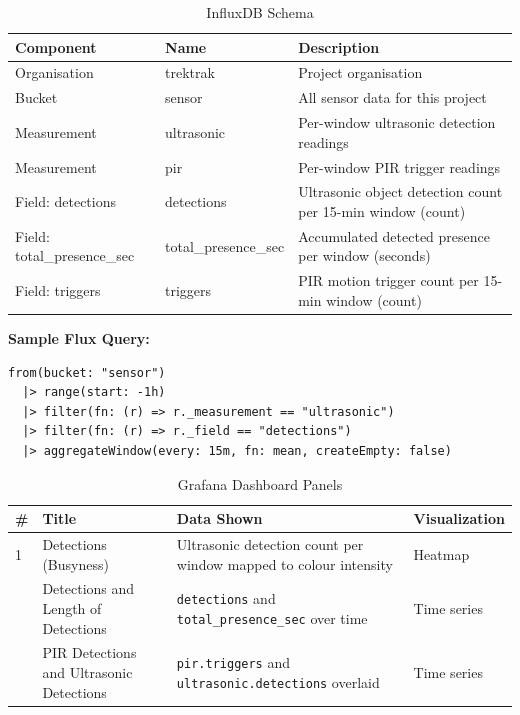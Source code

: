 \documentclass[11pt]{article}
\begin{document}
\vspace{0.5em}

\begin{table}[htbp]
\centering
\caption{InfluxDB Schema}
\label{tab:influx}
\begin{tabular}{@{}p{3cm}p{4cm}p{5cm}@{}}
\toprule
\textbf{Component} & \textbf{Name} & \textbf{Description} \\
\midrule
Organisation & trektrak & Project organisation \\
\addlinespace
Bucket & sensor & All sensor data for this project \\
\addlinespace
Measurement & ultrasonic & Per-window ultrasonic detection readings \\
\addlinespace
Measurement & pir & Per-window PIR trigger readings \\
\addlinespace
Field: detections & detections & Ultrasonic object detection count per 15-min window (count) \\
\addlinespace
Field: total\_presence\_sec & total\_presence\_sec & Accumulated detected presence per window (seconds) \\
\addlinespace
Field: triggers & triggers & PIR motion trigger count per 15-min window (count) \\
\bottomrule
\end{tabular}
\end{table}

\noindent\textbf{Sample Flux Query:}
\begin{verbatim}
from(bucket: "sensor")
  |> range(start: -1h)
  |> filter(fn: (r) => r._measurement == "ultrasonic")
  |> filter(fn: (r) => r._field == "detections")
  |> aggregateWindow(every: 15m, fn: mean, createEmpty: false)
\end{verbatim}

\vspace{0.5em}

\begin{table}[htbp]
\centering
\caption{Grafana Dashboard Panels}
\label{tab:panels}
\begin{tabular}{@{}p{0.5cm}p{3.5cm}p{4.5cm}p{3cm}@{}}
\toprule
\textbf{\#} & \textbf{Title} & \textbf{Data Shown} & \textbf{Visualization} \\
\midrule
1 & Detections (Busyness) & Ultrasonic detection count per window mapped to colour intensity & Heatmap \\
\addlinespace
2 & Detections and Length of Detections & \texttt{detections} and \texttt{total\_presence\_sec} over time & Time series \\
\addlinespace
3 & PIR Detections and Ultrasonic Detections & \texttt{pir.triggers} and \texttt{ultrasonic.detections} overlaid & Time series \\
\bottomrule
\end{tabular}
\end{table}
\end{document}
